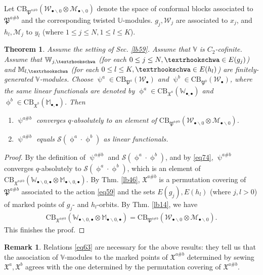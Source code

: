 \documentclass[12pt,a4paper,notitlepage]{article}
\theoremstyle{definition}
\newtheorem{rem}[df]{Remark}
\theoremstyle{plain}
\newtheorem{thm}[df]{Theorem}
\newcommand{\fk}{\mathfrak}
\newcommand{\mc}{\mathcal}
\newcommand{\scr}{\mathscr}
\newcommand{\blt}{\bullet}
\newcommand{\Vbb}{\mathbb V}
\newcommand{\Ubb}{\mathbb U}
\newcommand{\Wbb}{\mathbb W}
\newcommand{\Mbb}{\mathbb M}
\newcommand{\CB}{\mathrm{CB}}
\newcommand{\tipae}{\text{\textrhookschwa}}
\numberwithin{equation}{subsection}
\begin{document}
Let $\CB_{\fk P^{a\#b}}(\mc W_{\blt\backslash0}\otimes\mc M_{\blt\backslash0})$ denote the space of conformal blocks associated to $\fk P^{a\#b}$ and the corresponding twisted $\Ubb$-modules. $g_j,\mc W_j$ are associated to $x_j$, and $h_l,\mc M_j$ to $y_l$ (where $1\leq j\leq N,1\leq l\leq K$).

\begin{thm}\label{lb48}
Assume the setting of Sec. \ref{lb59}. Assume that $\Vbb$ is $C_2$-cofinite. Assume that $\Wbb_{j,\tipae}$ (for each $0\leq j\leq N,\tipae\in E(g_j)$) and $\Mbb_{l,\tipae}$ (for each $0\leq l\leq K,\tipae\in E(h_l)$) are finitely-generated $\Vbb$-modules. Choose $\uppsi^a\in\CB_{\fk P^a}(\mc W_\blt)$ and $\uppsi^b\in\CB_{\fk P^b}(\mc W_\blt)$, where the same linear functionals are denoted by $\upphi^a\in\CB_{\fk X^a}(\Wbb_{\blt,\blt})$ and $\upphi^b\in\CB_{\fk X^b}(\Mbb_{\blt,\blt})$. Then 
\begin{enumerate}[label=(\arabic*)]
\item $\uppsi^{a\#b}$ converges $q$-absolutely to an element of $\CB_{\fk P^{a\#b}}(\mc W_{\blt\backslash0}\otimes\mc M_{\blt\backslash0})$.
\item $\uppsi^{a\#b}$ equals $\scr S(\upphi^a\cdot \upphi^b)$ as linear functionals.
\end{enumerate}
\end{thm}



\begin{proof}
By the definition of $\uppsi^{a\#b}$ and $\scr S(\upphi^a\cdot \upphi^b)$, and by \eqref{eq74}, $\uppsi^{a\#b}$ converges $q$-absolutely to $\scr S(\upphi^a\cdot \upphi^b)$, which is an element of $\CB_{\fk X^{a\#b}}(\Wbb_{\blt\backslash0,\blt}\otimes\Mbb_{\blt\backslash0,\blt})$. By Thm. \ref{lb46}, $\fk X^{a\#b}$ is a permutation covering of $\fk P^{a\#b}$ associated to the action \eqref{eq59} and the sets $E(g_j),E(h_l)$ (where $j,l>0$) of marked points of $g_j$- and $h_l$-orbits. By Thm. \ref{lb14}, we have
\begin{align}
\CB_{\fk X^{a\#b}}(\Wbb_{\blt\backslash0,\blt}\otimes\Mbb_{\blt\backslash0,\blt})=\CB_{\fk P^{a\#b}}(\mc W_{\blt\backslash0}\otimes\mc M_{\blt\backslash0}).\label{eq75}
\end{align}
This finishes the proof.
\end{proof}


\begin{rem}
Relations \eqref{eq63} are necessary for the above results: they tell us that the association of $\Vbb$-modules to the marked points of $\fk X^{a\#b}$ determined by sewing $\fk X^a,\fk X^b$ agrees with the one determined by the permutation covering of $\fk X^{a\#b}$.
\end{rem}
\end{document}
